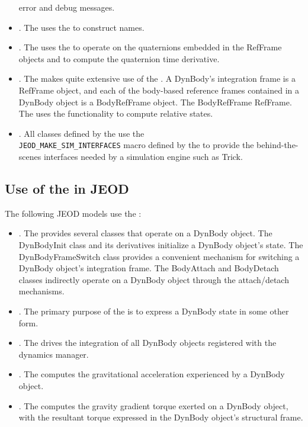 \begin{itemize}
  error and debug messages.
\item{}. The \ModelDesc uses the \NAMEDITEM to
  construct names.
\item{}. The \ModelDesc uses the \QUATERNION
  to operate on the quaternions embedded in the RefFrame objects and to
  compute the quaternion time derivative.
\item{}. The \ModelDesc makes quite extensive use of the
  \REFFRAMES. A DynBody's integration frame is a RefFrame object, and each of
  the body-based reference frames contained in a DynBody object is a
  BodyRefFrame object. The BodyRefFrame \isa RefFrame. The \ModelDesc uses
  the \REFFRAMES functionality to compute relative states.
\item{}. All classes defined by the \ModelDesc
  use the\\
  \verb+JEOD_MAKE_SIM_INTERFACES+ macro defined by the \SIMINTERFACE to provide
  the behind-the-scenes interfaces needed by a simulation engine such as Trick.
\end{itemize}


\subsection{Use of the \ModelDesc in JEOD}
The following JEOD models use the \ModelDesc:
\begin{itemize}
\item{}. The \BODYACTION provides several classes that
  operate on a DynBody object. The DynBodyInit class and its derivatives
  initialize a DynBody object's state. The DynBodyFrameSwitch class provides
  a convenient mechanism for switching a DynBody object's integration frame.
  The BodyAttach and BodyDetach classes indirectly operate on a DynBody object
  through the \ModelDesc attach/detach mechanisms.
\item{}. The primary purpose of the \DERIVEDSTATE
  is to express a DynBody state in some other form.
\item{}. The \DYNMANAGER drives the integration of
  all DynBody objects registered with the dynamics manager.
\item{}. The \GRAVITY computes the gravitational
  acceleration experienced by a DynBody object.
\item{}. The \GRAVITYTORQUE computes the gravity
  gradient torque exerted on a DynBody object, with the resultant torque
  expressed in the DynBody object's structural frame.
\end{itemize}


